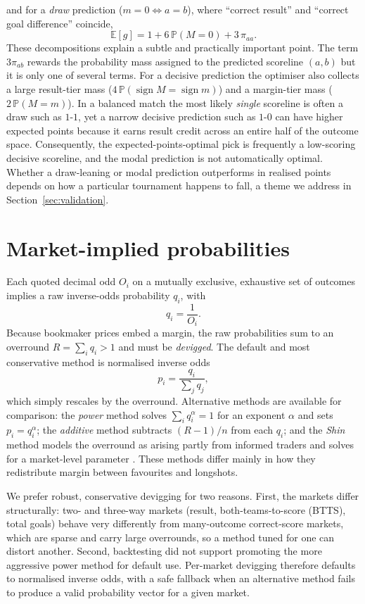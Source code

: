\documentclass[11pt]{article}
\newcommand{\Prob}{\mathbb{P}}
\newcommand{\E}{\mathbb{E}}
\newcommand{\sgn}{\operatorname{sign}}
\begin{document}
and for a \emph{draw} prediction ($m=0 \iff a=b$), where ``correct result'' and ``correct goal
difference'' coincide,
\begin{equation}
\E[g] = 1 +6\,\Prob(M=0) +3\,\pi_{aa}.
\label{eq:draw}
\end{equation}
These decompositions explain a subtle and practically important point. The term $3\pi_{ab}$ rewards the probability mass assigned to the predicted scoreline $(a,b)$ but it is only one of several terms. For a
decisive prediction the optimiser also collects a large result-tier mass
($4\,\Prob(\sgn M=\sgn m)$) and a margin-tier mass ($2\,\Prob(M=m)$). In a balanced match
the most likely \emph{single} scoreline is often a draw such as $1\text{-}1$, yet a narrow
decisive prediction such as $1\text{-}0$ can have higher expected points because it earns
result credit across an entire half of the outcome space. Consequently, the
expected-points-optimal pick is frequently a low-scoring decisive scoreline, and the modal
prediction is not automatically optimal. Whether a draw-leaning or modal prediction
outperforms in realised points depends on how a particular tournament happens to fall, a
theme we address in Section~\ref{sec:validation}.

\section{Market-implied probabilities}

Each quoted decimal odd $O_i$ on a mutually exclusive, exhaustive set of outcomes implies
a raw inverse-odds probability $q_i$, with
\[
q_i=\frac{1}{O_i}.
\]
Because bookmaker prices embed a margin, the raw probabilities sum to an overround
$R=\sum_i q_i>1$ and must be \emph{devigged}. The default and most conservative method is
normalised inverse odds
\begin{equation}
p_i=\frac{q_i}{\sum_j q_j},
\label{eq:devig}
\end{equation}
which simply rescales by the overround. Alternative methods are available for comparison:
the \emph{power} method solves $\sum_i q_i^{\alpha}=1$ for an exponent $\alpha$ and sets
$p_i=q_i^{\alpha}$; the \emph{additive} method subtracts $(R-1)/n$ from each $q_i$;
and the \emph{Shin} method models the overround as arising partly from informed traders
and solves for a market-level parameter \cite{shin1993}. These methods differ mainly in
how they redistribute margin between favourites and longshots.

We prefer robust, conservative devigging for two reasons. First, the markets differ
structurally: two- and three-way markets (result, both-teams-to-score (BTTS), total goals) behave very differently
from many-outcome correct-score markets, which are sparse and carry large overrounds, so a
method tuned for one can distort another. Second, backtesting did not support
promoting the more aggressive power method for default use. Per-market devigging
therefore defaults to normalised inverse odds, with
a safe fallback when an alternative method fails to produce a valid probability vector for a
given market.
\end{document}
